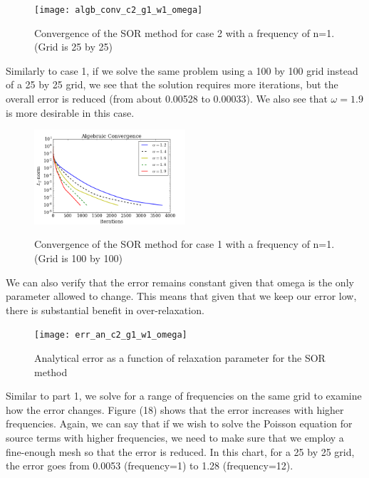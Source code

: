 \documentclass{article}
\begin{document}
\begin{figure}[H]
\centering
\texttt{[image: algb\_conv\_c2\_g1\_w1\_omega]}\label{Algebraic Convergence}
\caption{Convergence of the SOR method for case 2 with a frequency of n=1. (Grid is 25 by 25) }
\end{figure}

\noindent Similarly to case 1, if we solve the same problem using a 100 by 100 grid instead of a 25 by 25 grid, we see that the solution requires more iterations, but the overall error is reduced (from about 0.00528 to 0.00033). We also see that $\omega = 1.9$ is more desirable in this case.

\begin{figure}[H]
\centering
\includegraphics[width=0.5\textwidth]{algb_conv_c2_g3_w1_omega}\label{Algebraic Convergence}
\caption{Convergence of the SOR method for case 1 with a frequency of n=1. (Grid is 100 by 100) }
\end{figure}


\vspace{1em}

\noindent We can also verify that the error remains constant given that omega is the only parameter allowed to change. This means that given that we keep our error low, there is substantial benefit in over-relaxation.

\begin{figure}[H]
\centering
\texttt{[image: err\_an\_c2\_g1\_w1\_omega]}\label{error}
\caption{Analytical error as a function of relaxation parameter for the SOR method}
\end{figure}

\vspace{1em}

\noindent Similar to part 1, we solve for a range of frequencies on the same grid to examine how the error changes. Figure (18) shows that the error increases with higher frequencies. Again, we can say that if we wish to solve the Poisson equation for source terms with higher frequencies, we need to make sure that we employ a fine-enough mesh so that the error is reduced. In this chart, for a 25 by 25 grid, the error goes from 0.0053 (frequency=1) to 1.28 (frequency=12).
\end{document}
